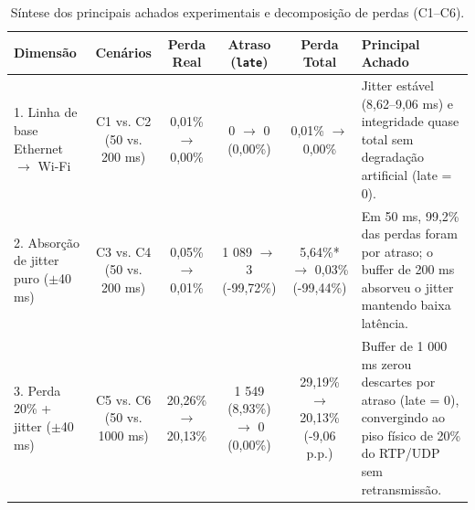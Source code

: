 \begin{table}[htbp]
  \centering
  \caption{Síntese dos principais achados experimentais e decomposição de perdas (C1--C6).}
  \label{tab:principais_achados}
  \begin{tabularx}{\textwidth}{lccccX}
    \toprule
    \textbf{Dimensão} & \textbf{Cenários} & \textbf{Perda Real} & \textbf{Atraso (\texttt{late})} & \textbf{Perda Total} & \textbf{Principal Achado} \\
    \midrule
    1. Linha de base Ethernet $\rightarrow$ Wi-Fi & C1 vs. C2 (50 vs. 200 ms) & 0,01\% $\rightarrow$ 0,00\% & 0 $\rightarrow$ 0 (0,00\%) & 0,01\% $\rightarrow$ 0,00\% & Jitter estável (8,62--9,06 ms) e integridade quase total sem degradação artificial (late = 0). \\
    2. Absorção de jitter puro ($\pm$40 ms) & C3 vs. C4 (50 vs. 200 ms) & 0,05\% $\rightarrow$ 0,01\% & 1 089 $\rightarrow$ 3 (-99,72\%) & 5,64\%* $\rightarrow$ 0,03\% (-99,44\%) & Em 50 ms, 99,2\% das perdas foram por atraso; o buffer de 200 ms absorveu o jitter mantendo baixa latência. \\
    3. Perda 20\% + jitter ($\pm$40 ms) & C5 vs. C6 (50 vs. 1000 ms) & 20,26\% $\rightarrow$ 20,13\% & 1 549 (8,93\%) $\rightarrow$ 0 (0,00\%) & 29,19\% $\rightarrow$ 20,13\% (-9,06 p.p.) & Buffer de 1 000 ms zerou descartes por atraso (late = 0), convergindo ao piso físico de 20\% do RTP/UDP sem retransmissão. \\
    \bottomrule
  \end{tabularx}
\end{table}
